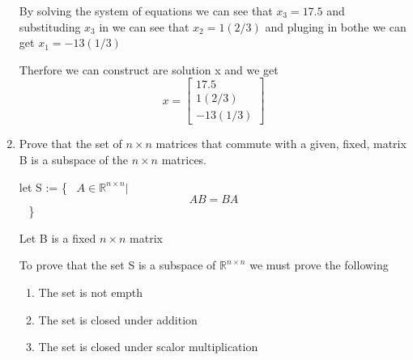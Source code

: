 \documentclass{article}
\begin{document}
\begin{enumerate}
    \par
    By solving the system of equations we can see that $x_3 = 17.5$ and substituding $x_3$ in we can see that $x_2 = 1(2/3)$ and pluging in bothe we can get $x_1 = -13(1/3)$
    \par
    Therfore we can construct are solution x and we get
    \[
      x = 
      \begin{bmatrix}
        17.5 \\
        1(2/3) \\
        -13(1/3) 
      \end{bmatrix}
    \]
  \item Prove that the set of $n \times n$ matrices that commute with a given, fixed, matrix B is a subspace of the $n \times n$ matrices.

    \begin{center}
      let S :=
      \left
      \{
        \mbox
        {
          $A \in \mathbb{R}^{n \times n}|$
          \[
            AB = BA
          \]
        }
        \right
      \}
      \par
      Let B is a fixed $n \times n$ matrix
    \end{center}
    \par
    To prove that the set S is a subspace of $\mathbb{R}^{n \times n}$ we must prove the following
    \begin{enumerate}
      \item The set is not empth
      \item The set is closed under addition
      \item The set is closed under scalor multiplication
    \end{enumerate}


\end{enumerate}
\end{document}
